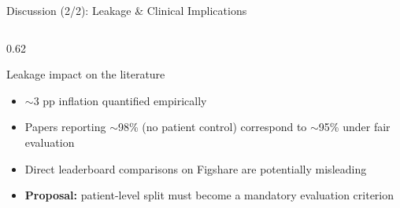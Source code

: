 \documentclass[aspectratio=169]{beamer}
\begin{document}
\begin{frame}{Discussion (2/2): Leakage \& Clinical Implications}
  \scriptsize
  \begin{columns}[T]
    \begin{column}{0.62\textwidth}
      {%
      \begin{alertblock}{Leakage impact on the literature}
        \begin{itemize}\itemsep1pt
          \item $\sim$3 pp inflation quantified empirically
          \item Papers reporting $\sim$98\% (no patient control) correspond to $\sim$95\% under fair evaluation
          \item Direct leaderboard comparisons on Figshare are potentially misleading
          \item \textbf{Proposal:} patient-level split must become a mandatory evaluation criterion
        \end{itemize}
      \end{alertblock}}


\end{column}
\end{columns}
\end{frame}
\end{document}
